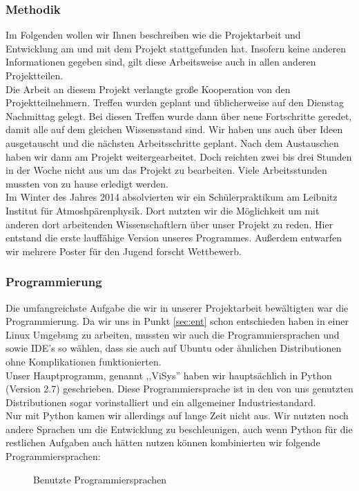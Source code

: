 \documentclass[a4paper,oneside,12pt,titlepage]{article}
\newcommand{\jf}{Jugend forscht }
\newcommand{\vs}{ViSys}
\begin{document}
\subsubsection{Methodik} %
Im Folgenden wollen wir Ihnen beschreiben wie die Projektarbeit und Entwicklung am  und mit dem Projekt stattgefunden hat.
Insofern keine anderen Informationen gegeben sind, gilt diese Arbeitsweise auch in allen anderen Projektteilen. \\
Die Arbeit an diesem Projekt verlangte große Kooperation von den Projektteilnehmern. Treffen wurden geplant und üblicherweise auf den Dienstag Nachmittag gelegt.
Bei diesen Treffen wurde dann über neue Fortschritte geredet, damit alle auf dem gleichen Wissensstand sind. Wir haben uns auch über Ideen ausgetauscht und die nächsten Arbeitsschritte geplant. Nach dem Austauschen haben wir dann am Projekt weitergearbeitet. Doch reichten zwei bis drei Stunden in der Woche nicht aus um das Projekt zu bearbeiten. Viele Arbeitsstunden mussten von zu hause erledigt werden.\\
Im Winter des Jahres 2014 absolvierten wir ein Schülerpraktikum am Leibnitz Institut für Atmoshpärenphysik. %
Dort nutzten wir die Möglichkeit um mit anderen dort arbeitenden Wissenschaftlern über unser Projekt zu reden. Hier entstand die erste lauffähige Version unseres Programmes. Außerdem entwarfen wir mehrere Poster für den \jf Wettbewerb.

\subsubsection{Programmierung}
Die umfangreichste Aufgabe die wir in unserer Projektarbeit bewältigten war die Programmierung. Da wir uns in Punkt \ref{sec:ent}  schon entschieden haben in einer Linux Umgebung zu arbeiten, mussten wir auch die Programmiersprachen und sowie IDE's so wählen, dass sie auch auf Ubuntu oder ähnlichen Distributionen ohne Komplikationen funktionierten.\\
Unser Hauptprogramm, genannt ,,\vs '' haben wir hauptsächlich in Python (Version 2.7) \cite{python27} geschrieben. Diese Programmiersprache ist in den von uns genutzten Distributionen sogar vorinstalliert und ein allgemeiner Industriestandard.\\
Nur mit Python kamen wir allerdings auf lange Zeit nicht aus. Wir nutzten noch andere Sprachen um die Entwicklung zu beschleunigen, auch wenn Python für die restlichen Aufgaben auch hätten nutzen können kombinierten wir folgende Programmiersprachen:
\begin{figure}[H]

\label{fig:pyvi}
\caption{Benutzte Programmiersprachen}
\end{figure}
\end{document}
